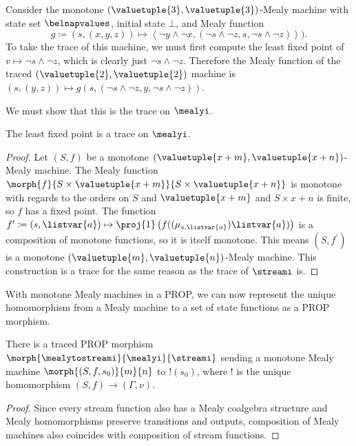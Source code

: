 \begin{example}\label{ex:trace-mealy}
    Consider the monotone \((\valuetuple{3},\valuetuple{3})\)-Mealy machine with
    state set \(\belnapvalues\), initial state \(\bot\), and Mealy function \[
        g \coloneqq (s, (x, y, z))
        \mapsto \left\langle \neg y \land \neg x,
        \left(\neg s \land \neg z, s, \neg s \land \neg z\right)
        \right\rangle
        ).\]
    To take the trace of this machine, we must first compute the least fixed
    point of \(v \mapsto \neg s \land \neg z\), which is clearly just
    \(\neg s \land \neg z\).
    Therefore the Mealy function of the traced
    \((\valuetuple{2}, \valuetuple{2})\) machine is \(
    (s, (y, z)) \mapsto g(s, (\neg s \land \neg z, y, \neg s \land \neg z))
    \).
\end{example}

We must show that this is the trace on \(\mealyi\).

\begin{proposition}
    The least fixed point is a trace on \(\mealyi\).
\end{proposition}
\begin{proof}
    Let \((S, f)\) be a monotone
    \((\valuetuple{x+m}, \valuetuple{x+n})\)-Mealy machine.
    The Mealy function \(
    \morph{f}{
        S \times \valuetuple{x+m}
    }{
        S \times \valuetuple{x+n}
    }
    \) is monotone with regards to the orders on \(S\) and
    \(\valuetuple{x+m}\) and \(S \times x+n\) is finite, so
    \(f\) has a fixed point.
    The function \(
    f^\prime \coloneqq (s, \listvar{a})
    \mapsto
    \proj{1}\left(f((\mu_{s,\listvar{a}})\listvar{a})\right)
    \) is a composition of monotone functions, so it is itself monotone.
    This means \((S, f^\prime)\) is a monotone \(
    (\valuetuple{m}, \valuetuple{n})
    \)-Mealy machine.
    This construction is a trace for the same reason as the trace of
    \(\streami\) is.
\end{proof}

With monotone Mealy machines in a PROP, we can now represent the unique
homomorphism from a Mealy machine to a set of state functions as a PROP
morphism.

\begin{proposition}\label{prop:mealy-to-stream}
    There is a traced PROP morphism
    \(\morph{\mealytostreami}{\mealyi}{\streami}\) sending a monotone Mealy
    machine \(\morph{\left(S, f, s_0\right)}{m}{n}\) to \(!(s_0)\), where \(!\)
    is the unique homomorphism \((S,f) \to (\Gamma,\nu)\).
\end{proposition}
\begin{proof}
    Since every stream function also has a Mealy coalgebra structure and Mealy
    homomorphisms preserve transitions and outputs,
    composition of Mealy machines also coincides with composition of stream
    functions.
\end{proof}

